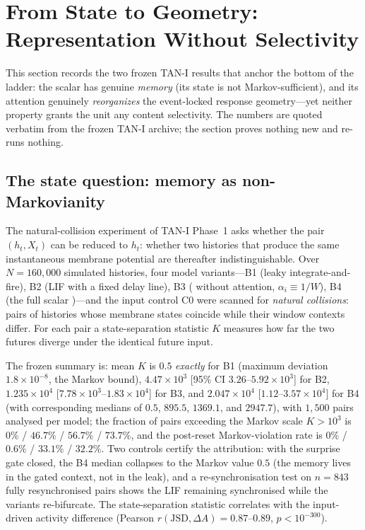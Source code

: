 \section{From State to Geometry: Representation Without Selectivity}
\label{sec:geometry}

This section records the two frozen TAN-I results that anchor the bottom of
the ladder: the scalar \TAN{} has genuine \emph{memory} (its state is not
Markov-sufficient), and its attention genuinely \emph{reorganizes} the
event-locked response geometry---yet neither property grants the unit any
content selectivity. The numbers are quoted verbatim from the frozen TAN-I
archive; the section proves nothing new and re-runs nothing.

\subsection{The state question: memory as non-Markovianity}
\label{sec:state}

The natural-collision experiment of TAN-I Phase~1 asks whether the pair
$(h_t,X_t)$ can be reduced to $h_t$: whether two histories that produce the
same instantaneous membrane potential are thereafter indistinguishable.
Over $N=160{,}000$ simulated histories, four model variants---B1 (leaky
integrate-and-fire), B2 (LIF with a fixed delay line), B3 (\TAN{} without
attention, $\alpha_i\equiv1/W$), B4 (the full scalar \TAN{})---and the input
control C0 were scanned for \emph{natural collisions}: pairs of histories
whose membrane states coincide while their window contexts differ. For each
pair a state-separation statistic $K$ measures how far the two futures
diverge under the identical future input.

The frozen summary is: mean $K$ is $0.5$ \emph{exactly} for B1 (maximum
deviation $1.8\times10^{-8}$, the Markov bound), $4.47\times10^{3}$
[95\% CI $3.26$--$5.92\times10^{3}$] for B2, $1.235\times10^{4}$
[$7.78\times10^{3}$--$1.83\times10^{4}$] for B3, and
$2.047\times10^{4}$ [$1.12$--$3.57\times10^{4}$] for B4 (with corresponding
medians of $0.5$, $895.5$, $1369.1$, and $2947.7$), with
$1{,}500$ pairs analysed per model; the fraction of pairs exceeding the
Markov scale $K>10^{3}$ is $0\%$ / $46.7\%$ / $56.7\%$ / $73.7\%$, and
the post-reset Markov-violation rate is $0\%$ / $0.6\%$ / $33.1\%$ /
$32.2\%$. Two controls certify the attribution: with the surprise gate
closed, the B4 median collapses to the Markov value $0.5$ (the memory lives
in the gated context, not in the leak), and a re-synchronisation test on
$n=843$ fully resynchronised pairs shows the LIF remaining synchronised
while the \TAN{} variants re-bifurcate. The state-separation statistic
correlates with the input-driven activity difference
(Pearson $r(\mathrm{JSD},\Delta A)=0.87$--$0.89$, $p<10^{-300}$).

